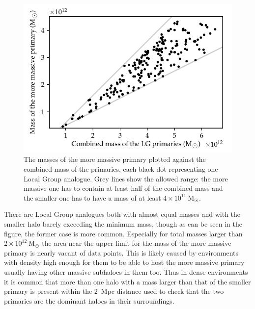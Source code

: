 \documentclass[english, oneside]{HYgradu}
\begin{document}
\begin{figure}
    \centering
    \includegraphics{kuvat/LGmasses.pdf}
    \caption{The masses of the more massive primary plotted against the combined mass of the primaries, each black dot representing one Local Group analogue. Grey lines show the allowed range: the more massive one has to contain at least half of the combined mass and the smaller one has to have a mass of at least $4 \times 10^{11}~\mathrm{M_{\astrosun}}$.}\label{fig:LGmasses}
\end{figure}

There are Local Group analogues both with almost equal masses and with the smaller halo barely exceeding the minimum mass, though as can be seen in the figure, the former case is more common. Especially for total masses larger than $2 \times 10^{12}~\mathrm{M_{\astrosun}}$ the area near the upper limit for the mass of the more massive primary is nearly vacant of data points. This is likely caused by environments with density high enough for them to be able to host the more massive primary usually having other massive subhaloes in them too. Thus in dense environments it is common that more than one halo with a mass larger than that of the smaller primary is present within the 2~Mpc distance used to check that the two primaries are the dominant haloes in their surroundings.
\end{document}
